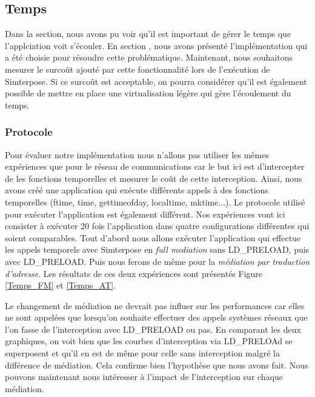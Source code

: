 \subsection{Temps}
\label{section:temps}
Dans la section, nous avons pu voir qu'il est important de gérer le temps que l'applciation voit s'écouler. En section , nous avons présenté l'implémentation qui a été choisie pour résoudre cette problématique. Maintenant, nous souhaitons mesurer le surcoût ajouté par cette fonctionnalité lors de l'exécution de Simterpose. Si ce surcoût est acceptable, on pourra considérer qu'il est également possible de mettre en place une virtualisation légère qui gère l'écoulement du temps.

\subsubsection{Protocole}
Pour évaluer notre implémentation nous n'allons pas utiliser les mêmes expériences que pour le réseau de communications car le but ici est d'intercepter de les fonctions temporelles et mesurer le coût de cette interception. Ainsi, nous avons créé une application qui exécute différents appels à des fonctions temporelles (ftime, time, gettimeofday, localtime, mktime...). Le protocole utilisé pour exécuter l'application est également différent. Nos expériences vont ici consister à exécuter 20 fois l'application dans quatre configurations différentes qui soient comparables. Tout d'abord nous allons exécuter l'application qui effectue les appels temporels avec Simterpose en \textit{full mediation} sans LD\_PRELOAD, puis avec LD\_PRELOAD. Puis nous ferons de même pour la \textit{médiation par traduction d'adresse}.  Les résultats de ces deux expériences sont présentés Figure \ref{Temps_FM} et \ref{Temps_AT}.

Le changement de médiation ne devrait pas influer sur les performances car elles ne sont appelées que lorsqu'on souhaite effectuer des appels systèmes réseaux que l'on fasse de l'interception avec LD\_PRELOAD ou pas. En comparant les deux graphiques, on voit bien que les courbes d'interception via LD\_PRELOAd se superposent et qu'il en est de même pour celle sans interception malgré la différence de médiation. Cela confirme bien l'hypothèse que nous avons fait. Nous pouvons maintenant nous intéresser à l'impact de l'interception sur chaque médiation.

